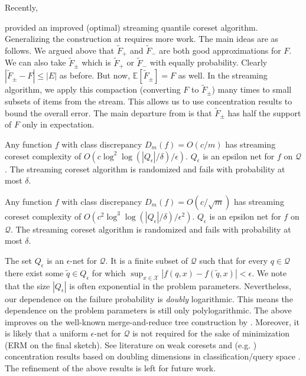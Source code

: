 \documentclass[12pt]{colt2019} %
\newcommand{\E}{\mathbb{E}}
\newcommand{\eps}{\epsilon}
\newcommand{\X}{\mathcal{X}}
\newcommand{\Q}{\mathcal{Q}}
\begin{document}
Recently, {\cite{DBLP:conf/focs/KarninLL16} provided an improved (optimal) streaming quantile coreset algorithm. 
Generalizing the construction at  \cite{DBLP:conf/focs/KarninLL16} requires more work. 
The main ideas are as follows. 
We argued above that $\tilde F_{+}$ and $\tilde F_{-}$ are both good approximations for $F$. 
We can also take $\tilde F_{\pm}$ which is $\tilde F_{+}$ or $\tilde F_{-}$ with equally probability. 
Clearly $|\tilde F_{\pm} - F| \le |E|$ as before. But now, $\E[\tilde F_{\pm}] = F$ as well. 
In the streaming algorithm, we apply this compaction (converting $F$ to $\tilde F_{\pm}$) many times to small subsets of items from the stream. This allows us to use concentration results to bound the overall error. 
The main departure from \cite{DBLP:conf/focs/KarninLL16} is that $\tilde F_{\pm}$ has half the support of $F$ only in expectation.

\begin{theorem} \label{thm:streaming12}
Any function $f$ with class discrepancy $D_m(f) = O(c/m)$ has streaming coreset complexity of $O\left(c\log^2\log(|Q_\eps|/\delta)/\eps\right)$.
$Q_\eps$ is an epsilon net for $f$ on $\Q$. 
The streaming coreset algorithm is randomized and fails with probability at most $\delta$.
\end{theorem}

\begin{theorem} \label{thm:streaming22}
Any function $f$ with class discrepancy $D_m(f) = O(c/\sqrt{m})$ has streaming coreset complexity of $O\left(c^2\log^3\log(|Q_\eps|/\delta) /\eps^2\right)$.
$Q_\eps$ is an epsilon net for $f$ on $\Q$. 
The streaming coreset algorithm is randomized and fails with probability at most $\delta$.
\end{theorem}

The set $Q_\eps$ is an $\eps$-net for $\Q$. 
It is a finite subset of $\Q$ such that for every $q \in \Q$ there exist some $\tilde{q} \in Q_\eps$ for which $\sup_{x \in \X} |f(q,x) - f(\tilde{q},x)| < \eps$. 
We note that the size $|Q_\eps|$ is often exponential in the problem parameters. 
Nevertheless, our dependence on the failure probability is \emph{doubly} logarithmic. 
This means the dependence on the problem parameters is still only polylogarithmic.
The above improves on the well-known merge-and-reduce tree construction by \cite{BENTLEY1980301}.
Moreover, it is likely that a uniform $\eps$-net for $\Q$ is not required for the sake of minimization (ERM on the final sketch).
See literature on weak coresets and (e.g. \cite{Feldman:2007:PKC:1247069.1247072}) concentration results based on doubling dimensions in classification/query space \cite{BSHOUTY2009323}. The refinement of the above results is left for future work.
 
}
\end{document}

